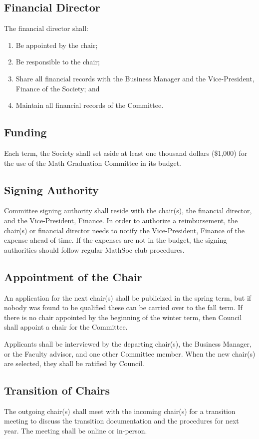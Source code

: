 \subsection{Financial Director}
The financial director shall:
\begin{enumerate}
\item Be appointed by the chair;
\item Be responsible to the chair;
\item Share all financial records with the Business Manager and the Vice-President, Finance of the Society; and
\item Maintain all financial records of the Committee.
\end{enumerate}

\subsection{Funding}
Each term, the Society shall set aside at least one thousand dollars (\$1,000) for the use of the Math Graduation Committee in its budget.

\subsection{Signing Authority}
Committee signing authority shall reside with the chair(s), the financial director, 
and the Vice-President, Finance. In order to authorize a reimbursement, the chair(s) 
or financial director needs to notify the Vice-President, Finance of the expense 
ahead of time. If the expenses are not in the budget, the signing authorities should 
follow regular MathSoc club procedures. 

\subsection{Appointment of the Chair}
An application for the next chair(s) shall be publicized in the spring term, but if 
nobody was found to be qualified these can be carried over to the fall term. If there 
is no chair appointed by the beginning of the winter term, then Council shall appoint 
a chair for the Committee.

Applicants shall be interviewed by the departing chair(s), the Business Manager, 
or the Faculty advisor, and one other Committee member.
When the new chair(s) are selected, they shall be ratified by Council.

\subsection{Transition of Chairs}
The outgoing chair(s) shall meet with the incoming chair(s) for a transition 
meeting to discuss the transition documentation and the procedures for next year. The 
meeting shall be online or in-person.

